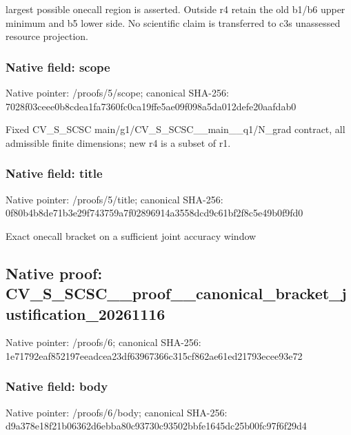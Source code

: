 \documentclass[10pt,a4paper]{article}
\begin{document}
largest possible onecall region is asserted. Outside r4 retain the old b1/b6 upper minimum and b5 lower side. No scientific claim is transferred to c3s unassessed resource projection.


\subsubsection{Native field: scope}


Native pointer: /proofs/5/scope; canonical SHA-256: 7028f03ceee0b8cdea1fa736\allowbreak{}0fc0ca19ffe5ae09f098a5da\allowbreak{}012defe20aafdab0


Fixed CV\_S\_SCSC main/g1/CV\_S\_SCSC\_\_main\_\_q1/N\_grad contract, all admissible finite dimensions; new r4 is a subset of r1.


\subsubsection{Native field: title}


Native pointer: /proofs/5/title; canonical SHA-256: 0f80b4b8de71b3e29f743759\allowbreak{}a7f02896914a3558dcd9c61b\allowbreak{}f2f8c5e49b0f9fd0


Exact onecall bracket on a sufficient joint accuracy window


\subsection{Native proof: CV\_S\_SCSC\_\_proof\_\_canoni\allowbreak{}cal\_bracket\_justificatio\allowbreak{}n\_20261116}


Native pointer: /proofs/6; canonical SHA-256: 1e71792eaf852197eeadcea2\allowbreak{}3df63967366c315cf862ae61\allowbreak{}ed21793ecee93e72



\subsubsection{Native field: body}


Native pointer: /proofs/6/body; canonical SHA-256: d9a378e18f21b06362d6ebba\allowbreak{}80c93730c93502bbfe1645dc\allowbreak{}25b00fc97f6f29d4
\end{document}
